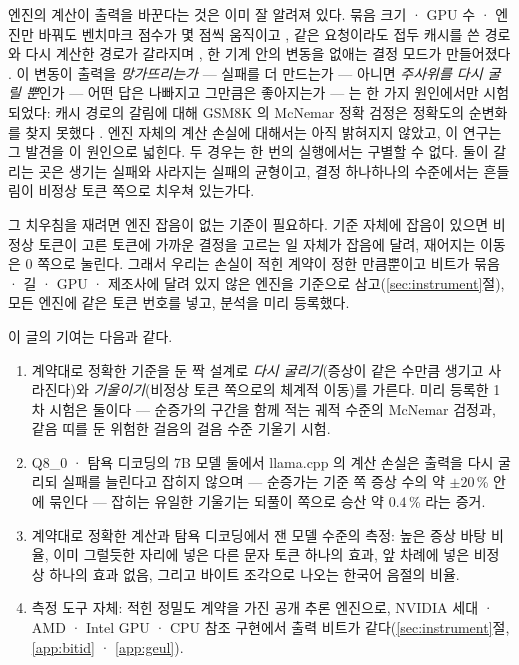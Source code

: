 \documentclass[11pt]{article}
\begin{document}
엔진의 계산이 출력을 바꾼다는 것은 이미 잘 알려져 있다. 묶음 크기 · GPU 수 · 엔진만 바꿔도 벤치마크 점수가 몇 점씩
움직이고 \citep{yuan2025,pape2026}, 같은 요청이라도 접두 캐시를 쓴 경로와 다시 계산한 경로가 갈라지며 \citep{patodiya2026},
한 기계 안의 변동을 없애는 결정 모드가 만들어졌다 \citep{he2025,qin2026}. 이 변동이 출력을 \emph{망가뜨리는가} --- 실패를
더 만드는가 --- 아니면 \emph{주사위를 다시 굴릴 뿐}인가 --- 어떤 답은 나빠지고 그만큼은 좋아지는가 --- 는 한 가지 원인에서만
시험되었다: 캐시 경로의 갈림에 대해 GSM8K 의 McNemar 정확 검정은 정확도의 순변화를 찾지 못했다 \citep{patodiya2026}. 엔진
자체의 계산 손실에 대해서는 아직 밝혀지지 않았고, 이 연구는 그 발견을 이 원인으로 넓힌다. 두 경우는 한 번의 실행에서는
구별할 수 없다. 둘이 갈리는 곳은 생기는 실패와 사라지는 실패의 균형이고, 결정 하나하나의 수준에서는 흔들림이 비정상 토큰
쪽으로 치우쳐 있는가다.

그 치우침을 재려면 엔진 잡음이 없는 기준이 필요하다. 기준 자체에 잡음이 있으면 비정상 토큰이 고른 토큰에 가까운 결정을 고르는
일 자체가 잡음에 달려, 재어지는 이동은 0 쪽으로 눌린다. 그래서 우리는 손실이 적힌 계약이 정한 만큼뿐이고 비트가 묶음 · 길 ·
GPU · 제조사에 달려 있지 않은 엔진을 기준으로 삼고(\ref{sec:instrument}절), 모든 엔진에 같은 토큰 번호를 넣고, 분석을 미리
등록했다.

이 글의 기여는 다음과 같다.
\begin{enumerate}
\item 계약대로 정확한 기준을 둔 짝 설계로 \emph{다시 굴리기}(증상이 같은 수만큼 생기고 사라진다)와 \emph{기울이기}(비정상 토큰
      쪽으로의 체계적 이동)를 가른다. 미리 등록한 1차 시험은 둘이다 --- 순증가의 구간을 함께 적는 궤적 수준의 McNemar 검정과,
      같음 띠를 둔 위험한 걸음의 걸음 수준 기울기 시험.
\item Q8\_0 · 탐욕 디코딩의 7B 모델 둘에서 llama.cpp 의 계산 손실은 출력을 다시 굴리되 실패를 늘린다고 잡히지 않으며 ---
      순증가는 기준 쪽 증상 수의 약 $\pm20$\,\% 안에 묶인다 --- 잡히는 유일한 기울기는 되풀이 쪽으로 승산 약 0.4\,\% 라는 증거.
\item 계약대로 정확한 계산과 탐욕 디코딩에서 잰 모델 수준의 측정: 높은 증상 바탕 비율, 이미 그럴듯한 자리에 넣은 다른 문자
      토큰 하나의 효과, 앞 차례에 넣은 비정상 하나의 효과 없음, 그리고 바이트 조각으로 나오는 한국어 음절의 비율.
\item 측정 도구 자체: 적힌 정밀도 계약을 가진 공개 추론 엔진으로, NVIDIA 세대 · AMD · Intel GPU · CPU 참조 구현에서 출력
      비트가 같다(\ref{sec:instrument}절, \ref{app:bitid} · \ref{app:geul}).
\end{enumerate}
\end{document}
